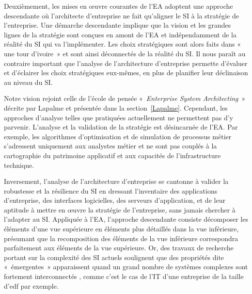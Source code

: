 Deuxièmement, les mises en œuvre courantes de l'EA adoptent une approche
descendante où l'architecte d'entreprise ne fait qu'aligner le SI à la
stratégie de l'entreprise. Une démarche descendante implique que la vision et
les grandes lignes de la stratégie sont conçues en amont de l'EA et
indépendamment de la réalité du SI qui va l'implémenter. Les choix stratégiques
sont alors faits dans «~ une tour d'ivoire~» et sont ainsi déconnectés de la
réalité du SI. Il nous paraît au contraire important que l'analyse de
l'architecture d'entreprise permette d'évaluer et d'éclairer les choix
stratégiques eux-mêmes, en plus de planifier leur déclinaison au niveau du SI.

Notre vision rejoint celle de l'école de pensée «~\textit{Enterprise System
Architecting}~» décrite par Lapalme \cite{lapalme2012three} et présentée dans
la section~\ref{Lapalme}. Cependant, les approches d'analyse telles que
pratiquées actuellement ne permettent pas d'y parvenir. L'analyse et la
validation de la stratégie est désincarnée de l'EA. Par exemple,
les algorithmes d'optimisation et de simulation de processus métier s'adressent
uniquement aux analystes métier et ne sont pas couplés à la cartographie du
patrimoine applicatif et aux capacités de l'infrastructure technique.

Inversement, l'analyse de l'architecture d'entreprise se cantonne à valider la
robustesse et la résilience du SI en dressant l'inventaire des applications
d'entreprise, des interfaces logicielles, des serveurs d'application, et de
leur aptitude à mettre en œuvre la stratégie de l'entreprise, sans jamais
chercher à l'adapter au SI. Appliquée à l'EA, l'approche descendante consiste
décomposer les éléments d'une vue supérieure en éléments plus détaillés dans la
vue inférieure, présumant que la recomposition des éléments de la vue
inférieure correspondra parfaitement aux éléments de la vue supérieure. Or, des
travaux de recherche portant sur la complexité des SI actuels soulignent que
des propriétés dite «~émergentes~» apparaissent quand un grand nombre de
systèmes complexes sont fortement interconnectés \cite{bullock2004complexity},
comme c'est le cas de l'IT d'une entreprise de la taille d'\gls{edf} par
exemple.

